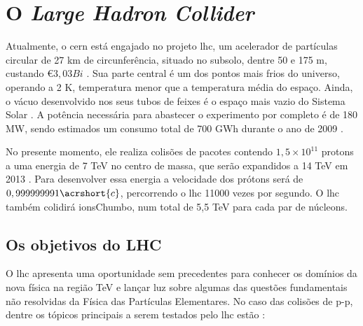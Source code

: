 \section{O \emph{Large Hadron Collider}}
\label{sec:lhc}


Atualmente, o \gls{cern} está engajado no projeto \gls{lhc}, 
um acelerador de partículas circular de 27 km de
circunferência, situado no subsolo, dentre 50 e 175 m, custando \euro $3,03
Bi$ \cite{webLHC}. Sua parte central é um dos pontos mais frios do universo,
operando a 2 K, temperatura menor que a temperatura média do espaço. Ainda, o
vácuo desenvolvido nos seus tubos de feixes é o espaço mais vazio do Sistema
Solar \cite{closerLook}. A potência necessária para abastecer o experimento por
completo é de 180 MW, sendo estimados um consumo total de 700 GWh durante o
ano de 2009 \cite{webLHC}. 

No presente momento, ele realiza colisões de pacotes contendo $1,5\times10^{11}$ \gls{protons} 
a uma energia de 7 TeV no centro de massa, que serão expandidos a 14 TeV em 2013
\cite{webATLAS}. Para desenvolver essa energia a velocidade dos prótons será de 
$0,999999991\acrshort{c}$, percorrendo o \gls{lhc} 11000 vezes por segundo.
O \gls{lhc} também colidirá \gls{ionsChumbo}, num total de 5,5 TeV para cada par
de núcleons.

\subsection{Os objetivos do LHC}
\label{ssec:obj_lhc}

O \gls{lhc} apresenta uma oportunidade sem precedentes para conhecer os domínios da
nova física na região TeV e lançar luz sobre algumas das questões fundamentais
não resolvidas da Física das Partículas Elementares.
No caso das colisões de p-p, dentre os tópicos principais a serem testados pelo
\gls{lhc} estão \cite{hunt_for_physics}:


